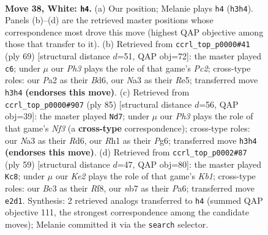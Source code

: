 \documentclass[11pt]{article}
\begin{document}
\clearpage

\begin{figure}[p]\centering
\begin{subfigure}{0.46\textwidth}\centering
\resizebox{\linewidth}{!}{%
\newchessgame
\chessboard[
  setfen={r1r3k1/pn3p2/1p2p1pp/8/2P5/N1B1P2P/PR2KPP1/7R w - - 5 38},
  showmover=false,
  pgfstyle=straightmove, color=movearrow, markmove={h3-h4}
]}
\caption{}
\end{subfigure}\hfill
\begin{subfigure}{0.46\textwidth}\centering
\resizebox{\linewidth}{!}{%
\newchessgame
\chessboard[
  setfen={8/2p3pk/3b1r2/P2pr2p/P3p3/2P3P1/5PNP/1R1R2K1 b - - 2 35},
  showmover=false,
  pgfstyle=straightmove, color=movearrow, markmove={c7-c6}
]}
\caption{}
\end{subfigure}
\\[4pt]
\begin{subfigure}{0.46\textwidth}\centering
\resizebox{\linewidth}{!}{%
\newchessgame
\chessboard[
  setfen={2r5/4kp2/p2rpnp1/N1p5/2P5/P1K1RPPp/1P5P/4R3 b - - 4 43},
  showmover=false,
  pgfstyle=straightmove, color=movearrow, markmove={f6-d7}
]}
\caption{}
\end{subfigure}\hfill
\begin{subfigure}{0.46\textwidth}\centering
\resizebox{\linewidth}{!}{%
\newchessgame
\chessboard[
  setfen={1k2rr2/2p5/p1p4n/1p2Ppb1/7p/7P/PPP3PB/3NRR1K b - - 1 30},
  showmover=false,
  pgfstyle=straightmove, color=movearrow, markmove={b8-c8}
]}
\caption{}
\end{subfigure}
\caption{\textbf{Move 38, White: \texttt{h4}.} (a) Our position; Melanie plays \texttt{h4} (\texttt{h3h4}). Panels (b)--(d) are the retrieved master positions whose correspondence most drove this move (highest QAP objective among those that transfer to it). (b) Retrieved from \texttt{ccrl\_top\_p0000\#41} (ply 69) [structural distance $d$=51, QAP obj=72]: the master played \texttt{c6}; under $\mu$ our \emph{Ph3} plays the role of that game's \emph{Pc2}; cross-type roles: our \emph{P}a2 as their \emph{B}d6, our \emph{N}a3 as their \emph{R}e5; transferred move \texttt{h3h4} \textbf{(endorses this move)}. (c) Retrieved from \texttt{ccrl\_top\_p0000\#907} (ply 85) [structural distance $d$=56, QAP obj=39]: the master played \texttt{Nd7}; under $\mu$ our \emph{Ph3} plays the role of that game's \emph{Nf3} (a \textbf{cross-type} correspondence); cross-type roles: our \emph{N}a3 as their \emph{R}d6, our \emph{R}h1 as their \emph{P}g6; transferred move \texttt{h3h4} \textbf{(endorses this move)}. (d) Retrieved from \texttt{ccrl\_top\_p0002\#87} (ply 59) [structural distance $d$=47, QAP obj=80]: the master played \texttt{Kc8}; under $\mu$ our \emph{Ke2} plays the role of that game's \emph{Kb1}; cross-type roles: our \emph{B}c3 as their \emph{R}f8, our \emph{n}b7 as their \emph{P}a6; transferred move \texttt{e2d1}. Synthesis: 2 retrieved analogs transferred to \texttt{h4} (summed QAP objective 111, the strongest correspondence among the candidate moves); Melanie committed it via the \texttt{search} selector.}
\label{fig:thought-m74}
\end{figure}
\end{document}
